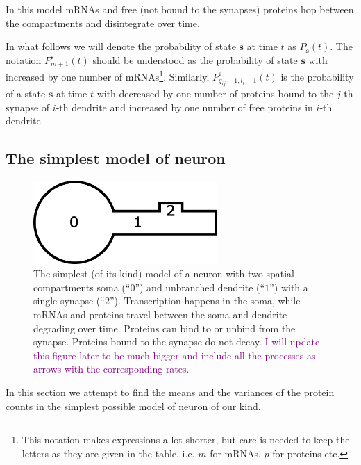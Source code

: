 \documentclass[a4paper, 11pt]{article}
\begin{document}
In this model mRNAs and free (not bound to the synapses) proteins hop between the compartments and disintegrate over time.

In what follows we will denote the probability of state $\mathbf s$ at time $t$ as $P_{\mathbf s}(t)$. The notation $P^{\mathbf s}_{m+1}(t)$ should be understood as the probability of state $\mathbf s$ with increased by one number of mRNAs\footnote{This notation makes expressions a lot shorter, but care is needed to keep the letters as they are given in the table, i.e. $m$ for mRNAs, $p$ for proteins etc.}. Similarly, $P^{\mathbf s}_{q_{ij}-1, l_i+1}(t)$ is the probability of a state $\mathbf s$ at time $t$ with decreased by one number of proteins bound to the $j$-th synapse of $i$-th dendrite and increased by one number of free proteins in $i$-th dendrite.


\subsection{The simplest model of neuron}
\begin{figure}
  \begin{center}
    \includegraphics[width=7cm]{img/simplest_neuron.png}
  \end{center}  
  \caption{The simplest (of its kind) model of a neuron with two spatial compartments soma (``$0$'') and unbranched dendrite (``$1$'') with a single synapse (``$2$''). Transcription happens in the soma, while mRNAs and proteins travel between the soma and dendrite degrading over time. Proteins can bind to or unbind from the synapse. Proteins bound to the synapse do not decay. \textcolor{purple}{I will update this figure later to be much bigger and include all the processes as arrows with the corresponding rates.}}
  \label{fig:simplest_neuron}
\end{figure}
In this section we attempt to find the means and the variances of the protein counts in the simplest possible model of neuron of our kind.
\end{document}

